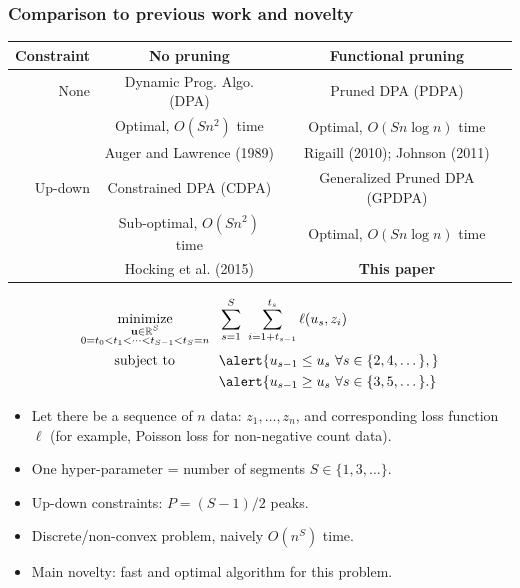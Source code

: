 \documentclass[t]{beamer}
\DeclareMathOperator*{\minimize}{minimize}
\newcommand{\RR}{\mathbb R}
\begin{document}
\begin{frame}
  \frametitle{Comparison to previous work and novelty}
{  \scriptsize
    \begin{tabular}{r|c|c}
    Constraint & No pruning & Functional pruning \\
    \hline
    None & Dynamic Prog. Algo. (DPA) & Pruned DPA (PDPA) \\
    & Optimal, $O(Sn^2)$ time & Optimal, $O(Sn\log n)$ time\\
    & Auger and Lawrence (1989) & Rigaill (2010); Johnson (2011) \\
    \hline
    Up-down & Constrained DPA (CDPA) & Generalized Pruned DPA (GPDPA) \\
    & Sub-optimal, $O(Sn^2)$ time & Optimal, $O(Sn\log n)$ time\\
    & Hocking et al. (2015) & \textbf{This paper} \\
    \hline
  \end{tabular}
}
\vspace{-0.3cm}
\begin{align*}
    \minimize_{\substack{
  \mathbf u\in\RR^{S}
\\
   0=t_0<t_1<\cdots<t_{S-1}<t_S=n
  }} &\ \ 
    \sum_{s=1}^S\  \sum_{i=1+t_{s-1}}^{t_s} \ell( u_s,  z_i) 
\\
      \text{subject to \hskip 0.75cm} &\ \ \alert{u_{s-1} \leq u_s\ \forall s\in\{2,4,\dots\},}
  \nonumber\\
  &\ \ \alert{u_{s-1} \geq u_s\ \forall s\in\{3,5,\dots\}.}
  \nonumber 
\end{align*}
\vskip -0.4cm
\begin{itemize}  
\item Let there be a sequence of $n$ data: $z_1,\dots,z_n$, and corresponding loss function $\ell$ (for example, Poisson loss for non-negative count data).
\item One hyper-parameter = number of segments $S\in\{1,3,\dots\}$.
\item \alert{Up-down constraints: $P=(S-1)/2$ peaks.}
\item Discrete/non-convex problem, naively $O(n^S)$ time.
\item Main novelty: fast and optimal algorithm for this
  problem.
\end{itemize}


\end{frame}
\end{document}
